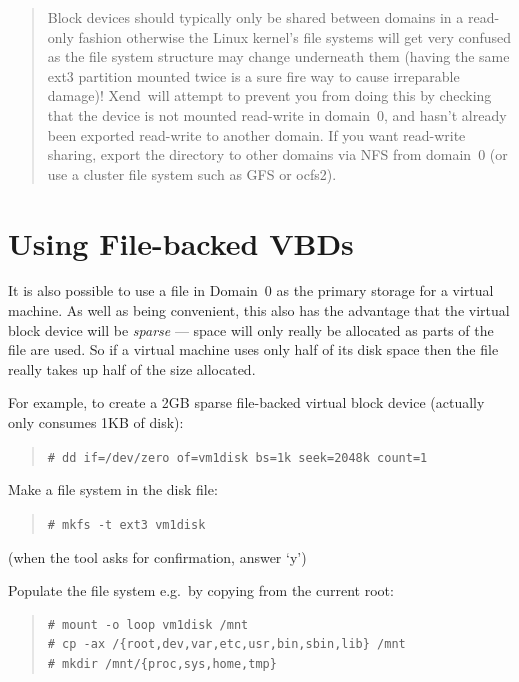 \documentclass[11pt,twoside,final,openright]{report}
\def\Xend{{Xend}\xspace}
\begin{document}
\begin{center}
\end{center}
\begin{quote}
  Block devices should typically only be shared between domains in a
  read-only fashion otherwise the Linux kernel's file systems will get
  very confused as the file system structure may change underneath
  them (having the same ext3 partition mounted  twice is a
  sure fire way to cause irreparable damage)!  \Xend\ will attempt to
  prevent you from doing this by checking that the device is not
  mounted read-write in domain~0, and hasn't already been exported
  read-write to another domain.  If you want read-write sharing,
  export the directory to other domains via NFS from domain~0 (or use
  a cluster file system such as GFS or ocfs2).
\end{quote}


\section{Using File-backed VBDs}

It is also possible to use a file in Domain~0 as the primary storage
for a virtual machine.  As well as being convenient, this also has the
advantage that the virtual block device will be \emph{sparse} ---
space will only really be allocated as parts of the file are used.  So
if a virtual machine uses only half of its disk space then the file
really takes up half of the size allocated.

For example, to create a 2GB sparse file-backed virtual block device
(actually only consumes 1KB of disk):
\begin{quote}
  \verb_# dd if=/dev/zero of=vm1disk bs=1k seek=2048k count=1_
\end{quote}

Make a file system in the disk file:
\begin{quote}
  \verb_# mkfs -t ext3 vm1disk_
\end{quote}

(when the tool asks for confirmation, answer `y')

Populate the file system e.g.\ by copying from the current root:
\begin{quote}
\begin{verbatim}
# mount -o loop vm1disk /mnt
# cp -ax /{root,dev,var,etc,usr,bin,sbin,lib} /mnt
# mkdir /mnt/{proc,sys,home,tmp}
\end{verbatim}
\end{quote}
\end{document}
